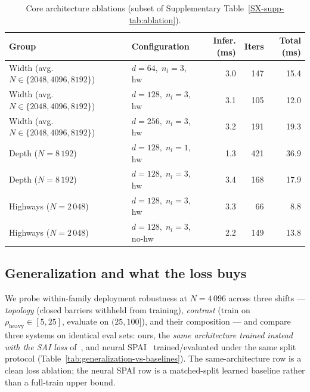\documentclass[acmtog,anonymous,review]{acmart}
\theoremstyle{plain}
\begin{document}
\begin{table}[t]
\centering
\caption{Core architecture ablations (subset of Supplementary
Table~\ref{SX-supp-tab:ablation}).}
\label{tab:ablation-core}
\scriptsize\setlength{\tabcolsep}{3pt}
\begin{tabular}{@{}l l rr r@{}}
\toprule
Group & Configuration & Infer. (ms) & Iters & Total (ms) \\
\midrule
Width (avg.\ $N\!\in\!\{2048,4096,8192\}$)
  & $d{=}64,\;n_l{=}3$, hw   & 3.0 & 147 & 15.4 \\
Width (avg.\ $N\!\in\!\{2048,4096,8192\}$)
  & $d{=}128,\;n_l{=}3$, hw  & 3.1 & 105 & 12.0 \\
Width (avg.\ $N\!\in\!\{2048,4096,8192\}$)
  & $d{=}256,\;n_l{=}3$, hw  & 3.2 & 191 & 19.3 \\
\midrule
Depth ($N\!=\!8\,192$)
  & $d{=}128,\;n_l{=}1$, hw  & 1.3 & 421 & 36.9 \\
Depth ($N\!=\!8\,192$)
  & $d{=}128,\;n_l{=}3$, hw  & 3.4 & 168 & 17.9 \\
\midrule
Highways ($N\!=\!2\,048$)
  & $d{=}128,\;n_l{=}3$, hw      & 3.3 & 66  & 8.8 \\
Highways ($N\!=\!2\,048$)
  & $d{=}128,\;n_l{=}3$, no-hw   & 2.2 & 149 & 13.8 \\
\bottomrule
\end{tabular}
\end{table}

\subsection{Generalization and what the loss buys}
\label{sec:results:generalization}
We probe within-family deployment robustness at $N\!=\!4\,096$ across three
shifts --- \emph{topology} (closed barriers withheld from training),
\emph{contrast} (train on $\rho_{\text{heavy}}\!\in\![5,25]$, evaluate on
$(25,100]$), and their composition --- and compare three systems on identical
eval sets: ours, the \emph{same architecture trained instead with the SAI loss}
of~\cite{Yang2025sparse}, and neural SPAI~\cite{Yang2025sparse} trained/evaluated
under the same split protocol (Table~\ref{tab:generalization-vs-baselines}). The
same-architecture row is a clean loss ablation; the neural SPAI row is a matched-split
learned baseline rather than a full-train upper bound.
\end{document}
